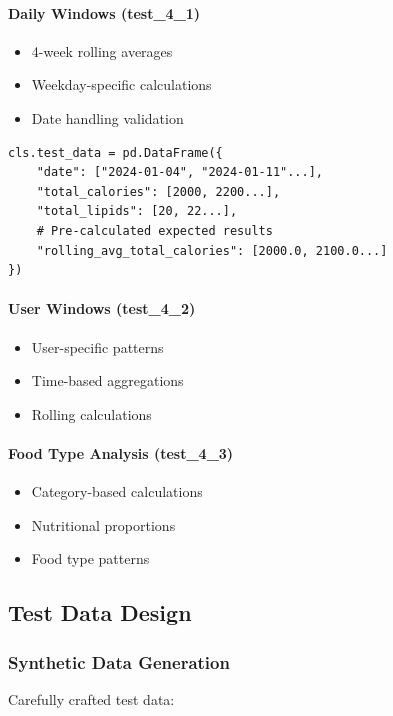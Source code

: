 \paragraph{Daily Windows (test\_4\_1)}
\begin{itemize}
    \item 4-week rolling averages
    \item Weekday-specific calculations
    \item Date handling validation
\end{itemize}

\begin{lstlisting}[style=pythonstyle, caption=Window Function Test Data]
cls.test_data = pd.DataFrame({
    "date": ["2024-01-04", "2024-01-11"...],
    "total_calories": [2000, 2200...],
    "total_lipids": [20, 22...],
    # Pre-calculated expected results
    "rolling_avg_total_calories": [2000.0, 2100.0...]
})
\end{lstlisting}

\paragraph{User Windows (test\_4\_2)}
\begin{itemize}
    \item User-specific patterns
    \item Time-based aggregations
    \item Rolling calculations
\end{itemize}

\paragraph{Food Type Analysis (test\_4\_3)}
\begin{itemize}
    \item Category-based calculations
    \item Nutritional proportions
    \item Food type patterns
\end{itemize}

\subsection{Test Data Design}

\subsubsection{Synthetic Data Generation}
Carefully crafted test data:

